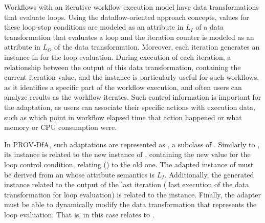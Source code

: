 Workflows with an iterative workflow execution model have data transformations that evaluate loops. Using the dataflow-oriented approach concepts, values for these loop-stop conditions are
modeled as an attribute in $L_I$ of a data transformation that evaluates a loop and the iteration counter is modeled as an attribute in $L_O$ of the data transformation.
Moreover, each iteration generates an instance in  for the loop evaluation. During execution of each iteration, a relationship between the output of this data transformation, containing the current iteration value, and the  instance is particularly useful for such workflows, as it identifies a specific part of the workflow execution, and often users can analyze results as the workflow iterates.
Such control information is important for the adaptation, as users can associate their specific actions with execution data, such as which point in workflow elapsed time that action happened or what memory or CPU consumption were.

In PROV-DfA, such adaptations are represented as , a subclass of .
Similarly to , its instance is related to the new instance of , containing the new value for the loop control condition, relating ()
to the old one.
The adapted instance of  must be derived from an  whose attribute semantics is $L_I$.
Additionally, the generated  instance related to the output of the last iteration (\ie{} last execution of the data transformation for loop evaluation) is related to the  instance.
Finally, the adapter must be able to dynamically modify the data transformation that represents the loop evaluation. That is,  in this case relates to .



